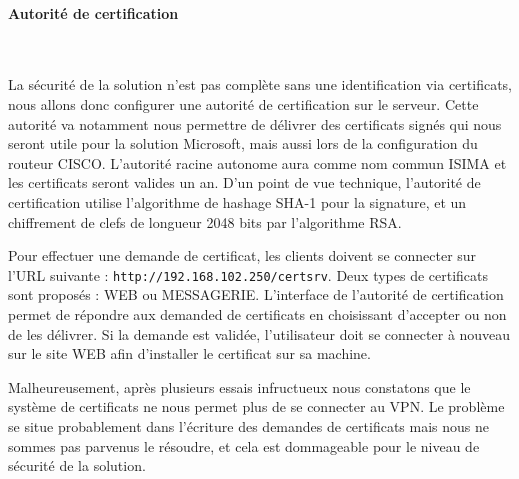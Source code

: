 



\paragraph{Autorité de certification}
~

La sécurité de la solution n'est pas complète sans une identification via certificats, nous allons donc configurer une autorité de certification sur le serveur. Cette autorité va notamment nous permettre de délivrer des certificats signés qui nous seront utile pour la solution Microsoft, mais aussi lors de la configuration du routeur CISCO. L'autorité racine autonome aura comme nom commun ISIMA et les certificats seront valides un an. D'un point de vue technique, l'autorité de certification utilise l'algorithme de hashage SHA-1 pour la signature, et un chiffrement de clefs de longueur 2048 bits par l'algorithme RSA.

Pour effectuer une demande de certificat, les clients doivent se connecter sur l'URL suivante : \verb|http://192.168.102.250/certsrv|. Deux types de certificats sont proposés : WEB ou MESSAGERIE. L'interface de l'autorité de certification permet de répondre aux demanded de certificats en choisissant d'accepter ou non de les délivrer. Si la demande est validée, l'utilisateur doit se connecter à nouveau sur le site WEB afin d'installer le certificat sur sa machine.

Malheureusement, après plusieurs essais infructueux nous constatons que le système de certificats ne nous permet plus de se connecter au VPN. Le problème se situe probablement dans l'écriture des demandes de certificats mais nous ne sommes pas parvenus le résoudre, et cela est dommageable pour le niveau de sécurité de la solution.

